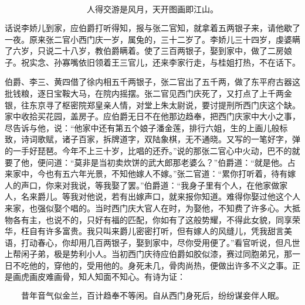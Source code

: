 \[
人得交游是风月，天开图画即江山。
\]

话说李娇儿到家，应伯爵打听得知，报与张二官知，就拿着五两银子来，请他歇了一夜。原来张二官小西门庆一岁，属兔的，三十二岁了。李娇儿三十四岁，虔婆瞒了六岁，只说二十八岁，教伯爵瞒着。使了三百两银子，娶到家中，做了二房娘子。祝实念、孙寡嘴依旧领着王三官儿，还来李家行走，与桂姐打热，不在话下。

伯爵、李三、黄四借了徐内相五千两银子，张二官出了五千两，做了东平府古器这批钱粮，逐日宝鞍大马，在院内摇摆。张二官见西门庆死了，又打点了上千两金银，往东京寻了枢密院郑皇亲人情，对堂上朱太尉说，要讨提刑所西门庆这个缺。家中收拾买花园，盖房子。应伯爵无日不在他那边趋奉，把西门庆家中大小之事，尽告诉与他，说：“他家中还有第五个娘子潘金莲，排行六姐，生的上画儿般标致，诗词歌赋，诸子百家，拆牌道字，双陆象棋，无不通晓。又写的一笔好字，弹的一手好琵琶。今年不上三十岁，比唱的还乔。”说的那张二官心中火动，巴不的就要了他，便问道：“莫非是当初卖炊饼的武大郎那老婆么？”伯爵道：“就是他。占来家中，今也有五六年光景，不知他嫁人不嫁。”张二官道：“累你打听着，待有嫁人的声口，你来对我说，等我娶了罢。”伯爵道：“我身子里有个人，在他家做家人，名来爵儿。等我对他说，若有出嫁声口，就来报你知道。难得你娶过他这个人来家，也强似娶个唱的。当时西门庆大官人在时，为娶他，不知费了许多心。大抵物各有主，也说不的，只好有福的匹配，你如有了这般势耀，不得此女貌，同享荣华，枉自有许多富贵。我只叫来爵儿密密打听，但有嫁人的风缝儿，凭我甜言美语，打动春心，你却用几百两银子，娶到家中，尽你受用便了。”看官听说，但凡世上帮闲子弟，极是势利小人。当初西门庆待应伯爵如胶似漆，赛过同胞弟兄，那一日不吃他的，穿他的，受用他的。身死未几，骨肉尚热，便做出许多不义之事。正是画虎画皮难画骨，知人知面不知心。有诗为证：

\[
昔年音气似金兰，百计趋奉不等闲。
自从西门身死后，纷纷谋妾伴人眠。
\]
